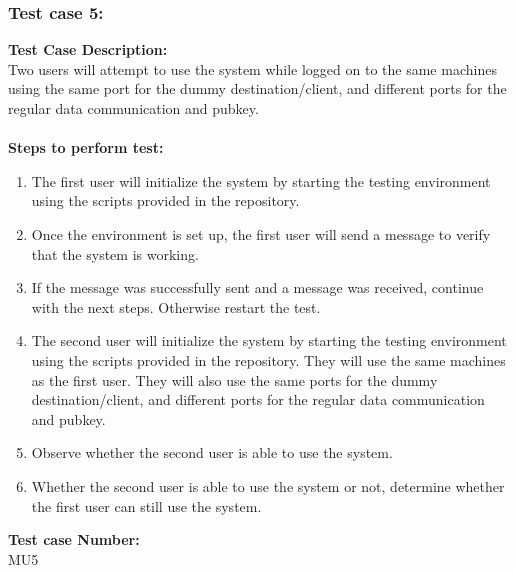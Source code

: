 \documentclass{article}
\begin{document}
\subsubsection{Test case 5: }
\textbf{Test Case Description:\\} Two users will attempt to use the system while logged on to the same machines using the same port for the dummy destination/client, and different ports for the regular data communication and pubkey.\\\\
\textbf{Steps to perform test: } 
\begin{enumerate}
    \item The first user will initialize the system by starting the testing environment using the scripts provided in the repository.
    \item Once the environment is set up, the first user will send a message to verify that the system is working.
    \item If the message was successfully sent and a message was received, continue with the next steps. Otherwise restart the test.
    \item The second user will initialize the system by starting the testing environment using the scripts provided in the repository. They will use the same machines as the first user. They will also use the same ports for the dummy destination/client, and different ports for the regular data communication and pubkey.
    \item Observe whether the second user is able to use the system.
    \item Whether the second user is able to use the system or not, determine whether the first user can still use the system.
\end{enumerate}
\textbf{Test case Number: \\} MU5
\end{document}
